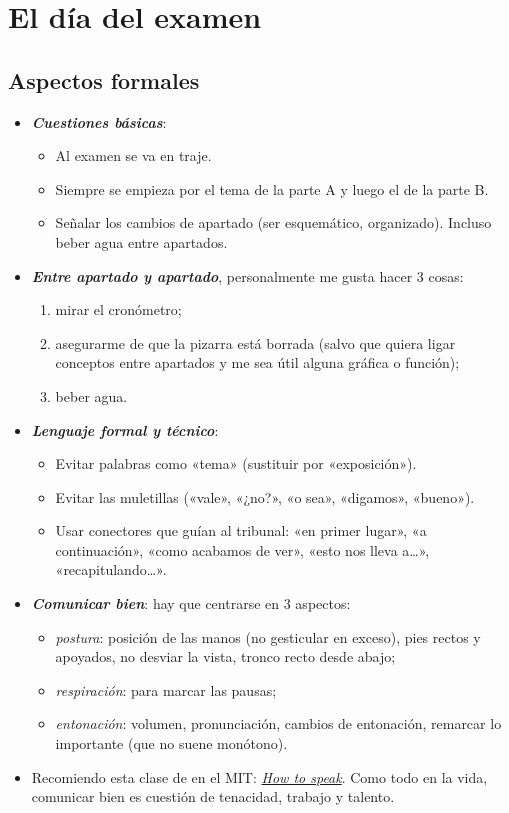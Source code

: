 \documentclass[11pt]{article}
\begin{document}
\section{El día del examen}\label{sec:formales}

\subsection{Aspectos formales}\label{sec:aspectos}

\begin{itemize}
\item \textbf{\emph{Cuestiones básicas}}:
  \begin{itemize}
  \item Al examen se va en traje.
  \item Siempre se empieza por el tema de la parte A y luego el de la parte B.
  \item Señalar los cambios de apartado (ser esquemático, organizado). Incluso beber agua entre apartados.
  \end{itemize}
\item \textbf{\emph{Entre apartado y apartado}}, personalmente me gusta hacer 3 cosas:
  \begin{enumerate}
  \item mirar el cronómetro;
  \item asegurarme de que la pizarra está borrada (salvo que quiera ligar conceptos entre apartados y me sea útil alguna gráfica o función);
  \item beber agua.
  \end{enumerate}
\item \textbf{\emph{Lenguaje formal y técnico}}:
  \begin{itemize}
  \item Evitar palabras como «tema» (sustituir por «exposición»).
  \item Evitar las muletillas («vale», «¿no?», «o sea», «digamos», «bueno»).
  \item Usar conectores que guían al tribunal: «en primer lugar», «a continuación», «como acabamos de ver», «esto nos lleva a…», «recapitulando…».
  \end{itemize}
\item \textbf{\emph{Comunicar bien}}: hay que centrarse en 3 aspectos:
  \begin{itemize}
  \item \emph{postura}: posición de las manos (no gesticular en exceso), pies rectos y apoyados, no desviar la vista, tronco recto desde abajo;
  \item \emph{respiración}: para marcar las pausas;
  \item \emph{entonación}: volumen, pronunciación, cambios de entonación, remarcar lo importante (que no suene monótono).
  \end{itemize}
\item Recomiendo esta clase de  en el MIT: \href{https://youtu.be/Unzc731iCUY}{\emph{How to speak}}. Como todo en la vida, comunicar bien es cuestión de tenacidad, trabajo y talento.
\end{itemize}
\end{document}
